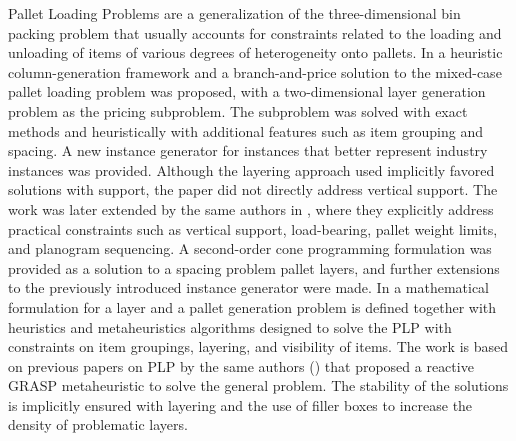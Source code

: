 Pallet Loading Problems are a generalization of the three-dimensional bin packing problem that usually accounts for constraints related to the loading and unloading of items of various degrees of heterogeneity onto pallets.
In \cite{elhedhli2019three} a heuristic column-generation framework and a branch-and-price solution to the mixed-case pallet loading problem was proposed, with a two-dimensional layer generation problem as the pricing subproblem.
The subproblem was solved with exact methods and heuristically with additional features such as item grouping and spacing.
A new instance generator for instances that better represent industry instances was provided. Although the layering approach used implicitly favored solutions with support, the paper did not directly address vertical support.
The work was later extended by the same authors in \cite{GZARA20201062}, where they explicitly address practical constraints such as vertical support, load-bearing, pallet weight limits, and planogram sequencing.
A second-order cone programming formulation was provided as a solution to a spacing problem pallet layers, and further extensions to the previously introduced instance generator were made.
In \cite{Calzavara2021} a mathematical formulation for a layer and a pallet generation problem is defined together with heuristics and metaheuristics algorithms designed to solve the PLP with constraints on item groupings, layering, and visibility of items.
The work is based on previous papers on PLP by the same authors (\cite{Iori2020a, Iori2020b, Iori2021}) that proposed a reactive GRASP metaheuristic to solve the general problem.
The stability of the solutions is implicitly ensured with layering and the use of filler boxes to increase the density of problematic layers.